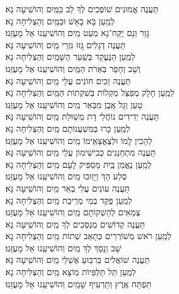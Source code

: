 \documentclass[twoside, openany, parskip=half, 11pt]{book}
\begin{document}
\begin{small}
תַּעֲנֶה אֱמוּנִים שׁוֹפְכִים לְךָ לֵב כַּמַּֽיִם \hfill וְהוֹשִֽׁיעָה נָּא׃\\
לְמַֽעַן בָּא בָאֵשׁ וּבַמַּֽיִם \hfill וְהַצְלִיחָה נָא׃ \\
גָּזַר וְנָם יֻקַּח־נָא מְעַט מַֽיִם \hfill וְהוֹשִׁיעֵֽנוּ אֵל מָעֻזֵּֽנוּ׃\\
תַּעֲנֶה דְגָלִים גָּֽזוּ גִּזְרֵי מַֽיִם \hfill וְהוֹשִֽׁיעָה נָּא׃\\
לְמַֽעַן הַנֶּעֱקַד בְּשַֽׁעַר הַשָּׁמַֽיִם \hfill וְהַצְלִיחָה נָא׃\\
וְשָׁב וְחָפַר בְּאֵרֹת הַמַּֽיִם \hfill וְהוֹשִׁיעֵֽנוּ אֵל מָעֻזֵּֽנוּ׃\\
תַּעֲנֶה זַכִּים חוֹנִים עֲלֵי מַֽיִם \hfill וְהוֹשִֽׁיעָה נָּא׃\\
לְמַֽעַן חָלָק מְפַצֵּל מַקְלוֹת בְּשִׁקְתוֹת הַמַּֽיִם \hfill וְהַצְלִיחָה נָא׃\\
טָעַן וְגָל אֶֽבֶן מִבְּאֵר מַֽיִם \hfill וְהוֹשִׁיעֵֽנוּ אֵל מָעֻזֵּֽנוּ׃\\
תַּעֲנֶה יְדִידִים נוֹחֲלֵי דָת מְשֽׁוּלַת מַֽיִם \hfill וְהוֹשִֽׁיעָה נָּא׃ \\
לְמַֽעַן כָּרוּ בְּמִשְׁעֲנוֹתָם מַֽיִם \hfill וְהַצְלִיחָה נָא׃\\
לְהָכִין לָֽמוֹ וּלְצֶאֱצָאֵֽימוֹ מַֽיִם \hfill וְהוֹשִׁיעֵֽנוּ אֵל מָעֻזֵּֽנוּ׃\\
תַּעֲנֶה מִתְחַנְּנִים כְּבִישִׁימוֹן עֲלֵי מַֽיִם \hfill וְהוֹשִֽׁיעָה נָּא׃\\
לְמַֽעַן נֶאֱמַן בַּֽיִת מַסְפִּיק לָעָם מַֽיִם \hfill וְהַצְלִיחָה נָא׃\\
סֶלַע הָךְ וַיָזֽוּבוּ מַֽיִם \hfill וְהוֹשִׁיעֵֽנוּ אֵל מָעֻזֵּֽנוּ׃ \\
תַּעֲנֶה עוֹנִים עֲלִי בְאֵר מַֽיִם \hfill וְהוֹשִֽׁיעָה נָּא׃ \\
לְמַֽעַן פֻּקַּד בְּמֵי מְרִֽיבַת מַֽיִם \hfill וְהַצְלִיחָה נָא׃\\
צְמֵאִים לְהַשְׁקוֹתָם מַֽיִם \hfill וְהוֹשִׁיעֵֽנוּ אֵל מָעֻזֵּנוּ׃ \\
תַּעֲנֶה קְדוֹשִׁים מְנַסְּכִים לְךָ מַֽיִם \hfill וְהוֹשִֽׁיעָה נָּא׃ \\
לְמַֽעַן רֹאשׁ מְשׁוֹרְרִים כְּתָאַב שְׁתוֹת מַֽיִם \hfill וְהַצְלִיחָה נָא׃\\
שָׁב וְנָסַךְ לְךָ מַֽיִם \hfill וְהוֹשִׁיעֵֽנוּ אֵל מָעֻזֵּֽנוּ׃\\
תַּעֲנֶה שׁוֹאֲלִים בְּרִבּֽוּעַ אֶשְׁלֵי מַֽיִם \hfill וְהוֹשִֽׁיעָה נָּא׃ \\
לְמַֽעַן תֵּל תַּלְפִּיוֹת מֽוֹצָא מַֽיִם \hfill וְהַצְלִיחָה נָא׃\\
תִּפְתַּח אֶֽרֶץ וְתַרְעִיף שָׁמַֽיִם \hfill וְהוֹשִׁיעֵֽנוּ אֵל מָעֻזֵּֽנוּ׃

\end{small}
\end{document}
